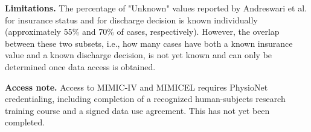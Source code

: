 \documentclass[authoryear,preprint,12pt]{elsarticle}
\begin{document}
\textbf{Limitations.} The percentage of "Unknown" values reported by Andreswari et al. for insurance status and for discharge decision is known individually (approximately 55\% and 70\% of cases, respectively). However, the overlap between these two subsets, i.e., how many cases have both a known insurance value and a known discharge decision, is not yet known and can only be determined once data access is obtained.

\textbf{Access note.} Access to MIMIC-IV and MIMICEL requires PhysioNet credentialing, including completion of a recognized human-subjects research training course and a signed data use agreement. This has not yet been completed. 




\end{document}
